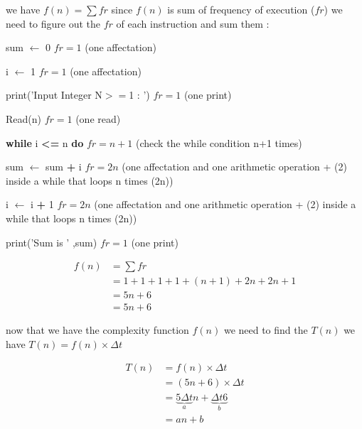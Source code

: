 we have \(f(n) = \sum fr\) since \(f(n)\) is sum of frequency of execution (\(fr\)) we need to figure out the
\(fr\) of each instruction and sum them : 

\vspace{0.5cm}
sum $\gets$ 0  \hspace{4.15cm} \(fr = 1\) (one affectation)

\vspace{0.15cm}
i $\gets$ 1  \hspace{4.65cm} \(fr = 1\) (one affectation)

\vspace{0.15cm}
\textcolor{purplePlot!80!black}{print}(\textcolor{blueArea!60!black}{'Input Integer N\(>=\)1 : '})  \hspace{1.5cm} \(fr = 1\) (one print)

\vspace{0.15cm}
\textcolor{purplePlot!80!black}{Read}(n)  \hspace{4.25cm} \(fr = 1\) (one read)

\vspace{0.15cm}

\textbf{while} i \textcolor{redPlot}{\textbf{\textless=}} n  \textbf{do} \hspace{2.75cm} \(fr = n+1\) (check the while condition n+1 times)

\vspace{0.15cm}
sum $\gets$ sum \textcolor{redPlot}{ \textbf{+}} i \hspace{3cm} \(fr = 2n\) (one affectation and one arithmetic operation + (2) inside a while that loops n times (2n))

\vspace{0.15cm}
i $\gets$ i \textcolor{redPlot}{ \textbf{+}} 1 \hspace{4cm} \(fr = 2n\) (one affectation and one arithmetic operation + (2) inside a while that loops n times (2n))

\vspace{0.15cm}

\textcolor{purplePlot!80!black}{print}(\textcolor{blueArea!60!black}{'Sum is ' },{sum}) \hspace{2.25cm} \(fr = 1\) (one print)

\vspace{0.75cm}
\begin{align*}
f(n) &= \sum fr \\
     &= 1 + 1 + 1 + 1 + (n+1) + 2n + 2n + 1 \\
     &= 5n + 6 \\
     &= \boxed{5n + 6}
\end{align*}

\vspace{0.5cm}
now that we have the complexity function \(f(n)\) we need to find the \(T(n)\)  we have \(T(n) = f(n) \times \Delta t\)

\begin{align*}
T(n) &= f(n) \times \Delta t\\ 
&= (5n + 6) \times \Delta t \\
&= \underbrace{5 \Delta t}_{a} n + \underbrace{\Delta t 6}_{b} \\
&= \boxed{an+b} 
\end{align*}


